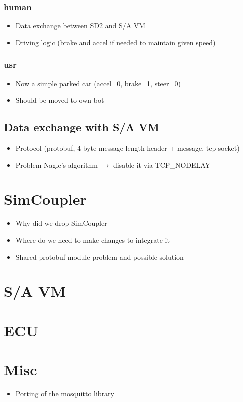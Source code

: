 \documentclass[paper=a4, fontsize=11pt]{scrreprt}
\begin{document}
\subsubsection{human}
\begin{itemize}
  \item Data exchange between SD2 and S/A VM
  \item Driving logic (brake and accel if needed to maintain given speed)
\end{itemize}
\subsubsection{usr}
\begin{itemize}
  \item Now a simple parked car (accel=0, brake=1, steer=0)
  \item Should be moved to own bot
\end{itemize}
\subsection{Data exchange with S/A VM}
\begin{itemize}
  \item Protocol (protobuf, 4 byte message length header + message, tcp socket)
  \item Problem Nagle's algorithm $\rightarrow$ disable it via TCP\_NODELAY
\end{itemize}
\section{SimCoupler}
\begin{itemize}
  \item Why did we drop SimCoupler
  \item Where do we need to make changes to integrate it
  \item Shared protobuf module problem and possible solution
\end{itemize}
\section{S/A VM}
\section{ECU}
\section{Misc}
\begin{itemize}
  \item Porting of the mosquitto library %
\end{itemize}


\end{document}
